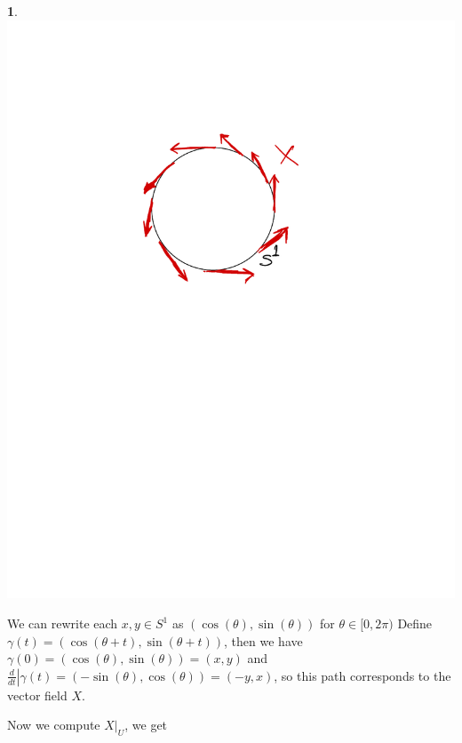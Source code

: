 \documentclass[10.5pt]{article}
\theoremstyle{definition}
\newtheorem{pb}{}
\begin{document}
    \begin{pb}
        \includegraphics[scale=1]{graphics/Tighe.pdf}
        \newpage

        We can rewrite each \(x,y \in S^1\) as \((\cos(\theta),\sin(\theta))\) for \(\theta \in [0,2\pi)\) Define \(\gamma(t) = (\cos(\theta + t),\sin(\theta + t))\), then we have
        \(\gamma(0) = (\cos(\theta),\sin(\theta)) = (x,y)\) and \(\left.\frac{d}{dt}\right\vert \gamma(t) = (-\sin(\theta),\cos(\theta)) = (-y,x)\), so this path corresponds to the vector field \(X\).

        Now we compute \(X\vert_U\), we get


\end{pb}
\end{document}
